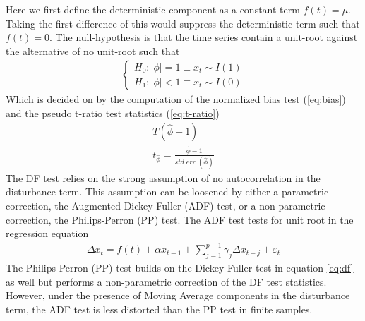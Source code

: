 Here we first define the deterministic component as a constant term $f(t)=\mu$. Taking the first-difference of this would suppress the deterministic term such that $f(t)=0$. The null-hypothesis is that the time series contain a unit-root against the alternative of no unit-root such that
\begin{align}
  \left\{\begin{array}{c}
  H_0:|\phi|=1\equiv x_t\sim I(1)\\
  H_1:|\phi|<1\equiv x_t\sim I(0)
  \end{array}\right.
  \label{eq:H0}
\end{align}
Which is decided on by the computation of the normalized bias test (\ref{eq:bias}) and the pseudo t-ratio test statistics (\ref{eq:t-ratio})
\begin{align}
  T(\hat{\phi}-1) \label{eq:bias}\\
  t_{\hat{\phi}}=\frac{\hat{\phi}-1}{std.err.(\hat{\phi})}\label{eq:t-ratio}
\end{align}
The DF test relies on the strong assumption of no autocorrelation in the disturbance term. This assumption can be loosened by either a parametric correction, the Augmented Dickey-Fuller (ADF) test, or a non-parametric correction, the Philips-Perron (PP) test. The ADF test tests for unit root in the regression equation
\begin{align}
  \Delta x_t=f(t)+\alpha x_{t-1}+\sum_{j=1}^{p-1}\gamma_j\Delta x_{t-j}+\varepsilon_t
  \label{eq:adf}
\end{align}
The Philips-Perron (PP) test builds on the Dickey-Fuller test in equation \ref{eq:df} as well but performs a non-parametric correction of the DF test statistics. However, under the presence of Moving Average components in the disturbance term, the ADF test is less distorted than the PP test in finite samples.


